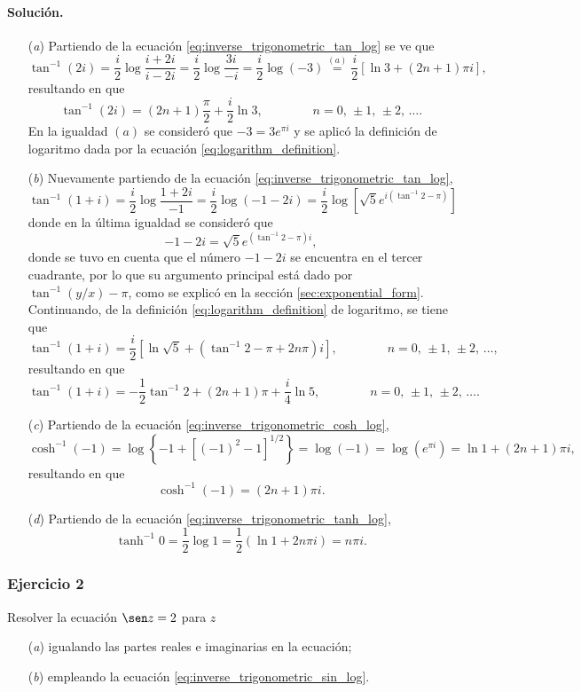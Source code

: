 \documentclass[a4paper]{report}
\begin{document}
\paragraph{Solución.} 
\begin{enumerate}
 \item[(\textit{a})] Partiendo de la ecuación \ref{eq:inverse_trigonometric_tan_log} se ve que 
 \[
  \tan^{-1}(2i)=\frac{i}{2}\log\frac{i+2i}{i-2i}=\frac{i}{2}\log\frac{3i}{-i}
  =\frac{i}{2}\log(-3)\overset{(a)}{=}\frac{i}{2}\left[\ln3+(2n+1)\pi i\right],
 \]
 resultando en que 
 \[
  \tan^{-1}(2i)=(2n+1)\frac{\pi}{2}+\frac{i}{2}\ln3,
  \qquad\qquad
  n=0,\,\pm1,\,\pm2,\,\dots.
 \]
 En la igualdad \((a)\) se consideró que \(-3=3e^{\pi i}\) y se aplicó la definición de logaritmo dada por la ecuación \ref{eq:logarithm_definition}.
 \item[(\textit{b})] Nuevamente partiendo de la ecuación \ref{eq:inverse_trigonometric_tan_log},
 \[
  \tan^{-1}(1+i)=\frac{i}{2}\log\frac{1+2i}{-1}=\frac{i}{2}\log(-1-2i)
  =\frac{i}{2}\log\left[\sqrt{5}e^{i(\tan^{-1}2-\pi)}\right]
 \]
 donde en la última igualdad se consideró que 
 \[
  -1-2i=\sqrt{5}e^{(\tan^{-1}2-\pi)i},
 \]
 donde se tuvo en cuenta que el número \(-1-2i\) se encuentra en el tercer cuadrante, por lo que su argumento principal está dado por \(\tan^{-1}(y/x)-\pi\), como se explicó en la sección \ref{sec:exponential_form}. Continuando, de la definición \ref{eq:logarithm_definition} de logaritmo, se tiene que 
 \[
  \tan^{-1}(1+i)=\frac{i}{2}\left[\ln\sqrt{5}+(\tan^{-1}2-\pi+2n\pi)i\right],
  \qquad\qquad
  n=0,\,\pm1,\,\pm2,\,\dots,
 \]
 resultando en que 
 \[
  \tan^{-1}(1+i)=-\frac{1}{2}\tan^{-1}2+(2n+1)\pi+\frac{i}{4}\ln5,
  \qquad\qquad
  n=0,\,\pm1,\,\pm2,\,\dots.
 \]
 \item[(\textit{c})] Partiendo de la ecuación \ref{eq:inverse_trigonometric_cosh_log},
 \[
  \cosh^{-1}(-1)=\log\left\{-1+[(-1)^2-1]^{1/2}\right\}=\log(-1)
  =\log(e^{\pi i})=\ln1+(2n+1)\pi i,
 \]
 resultando en que 
 \[
  \cosh^{-1}(-1)=(2n+1)\pi i.
 \]
 \item[(\textit{d})] Partiendo de la ecuación \ref{eq:inverse_trigonometric_tanh_log},
 \[
  \tanh^{-1}0=\frac{1}{2}\log1=\frac{1}{2}\left(\ln1+2n\pi i\right)=n\pi i.
 \]
\end{enumerate}

\subsubsection{Ejercicio 2}

Resolver la ecuación \(\sen z=2\) para \(z\)
\begin{enumerate}
 \item[(\textit{a})] igualando las partes reales e imaginarias en la ecuación;
 \item[(\textit{b})] empleando la ecuación \ref{eq:inverse_trigonometric_sin_log}.
\end{enumerate}
\end{document}
